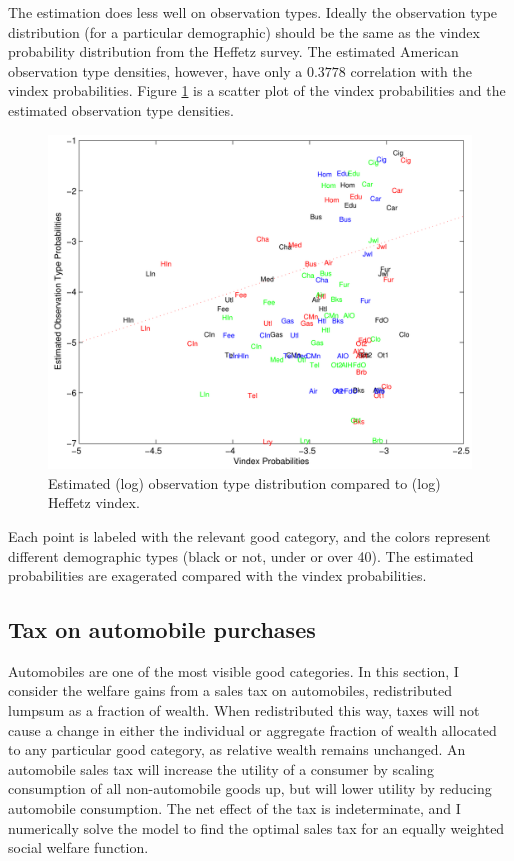 \documentclass[12pt]{article}
\begin{document}
The estimation does less well on observation types.
Ideally the observation type distribution (for a particular demographic) should be the same as the vindex probability distribution from the Heffetz survey.
The estimated American observation type densities, however, have only a $0.3778$ correlation with the vindex probabilities.
Figure \ref{fig:vinmatch} is a scatter plot of the vindex probabilities and the estimated observation type densities.
\begin{figure}
    \centering
	\includegraphics[scale=.8]{pics/vinmatch_cropped.pdf}
    \caption{Estimated (log) observation type distribution compared to (log) Heffetz vindex.}
    \label{fig:vinmatch}
\end{figure}
Each point is labeled with the relevant good category, and the colors represent different demographic types (black or not, under or over 40).
The estimated probabilities are exagerated compared with the vindex probabilities.

\subsection{Tax on automobile purchases}

Automobiles are one of the most visible good categories. In this section, I consider the welfare gains from a sales tax on automobiles, redistributed lumpsum as a fraction of wealth.  When redistributed this way, taxes will not cause a change in either the individual or aggregate fraction of wealth allocated to any particular good category, as relative wealth remains unchanged.  
An automobile sales tax will increase the utility of a consumer by scaling consumption of all non-automobile goods up, but will lower utility by reducing automobile consumption.  The net effect of the tax is indeterminate, and I numerically solve the model to find the optimal sales tax for an equally weighted social welfare function.
\end{document}
